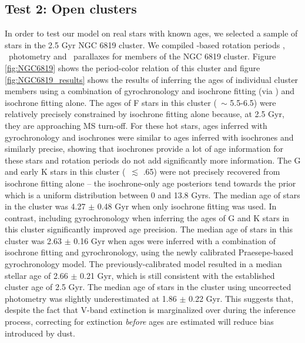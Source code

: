 \subsection{Test 2: Open clusters}
In order to test our model on real stars with known ages, we selected a sample
of stars in the 2.5 Gyr NGC 6819 cluster.
We compiled \kepler-based rotation periods \citep{meibom2015}, \Gaia\
photometry and \gaia\ parallaxes for members of the NGC 6819 cluster.
Figure \ref{fig:NGC6819} shows the period-color relation of this
cluster and figure \ref{fig:NGC6819_results} shows the results of inferring
the ages of individual cluster members using a combination of gyrochronology
and isochrone fitting (via \sd) and isochrone fitting alone.
The ages of F stars in this cluster (\gcolor\ $\sim$ 5.5-6.5) were relatively
precisely constrained by isochrone fitting alone because, at 2.5 Gyr, they are
approaching MS turn-off.
For these hot stars, ages inferred with gyrochronology and isochrones were
similar to ages inferred with isochrones and similarly precise, showing that
isochrones provide a lot of age information for these stars and rotation
periods do not add significantly more information.
The G and early K stars in this cluster (\gcolor\ $\lesssim$ .65) were not
precisely recovered from isochrone fitting alone -- the isochrone-only age
posteriors tend towards the prior which is a uniform distribution between 0
and 13.8 Gyrs.
The median age of stars in the cluster was 4.27 $\pm$ 0.48 Gyr when only
isochrone fitting was used.
In contrast, including gyrochronology when inferring the ages of G and K stars
in this cluster significantly improved age precision.
The median age of stars in this cluster was 2.63 $\pm$ 0.16 Gyr when ages were
inferred with a combination of isochrone fitting and gyrochronology, using the
newly calibrated Praesepe-based gyrochronology model.
The previously-calibrated \citet{angus2015} model resulted in a median stellar
age of 2.66 $\pm$ 0.21 Gyr, which is still consistent with the established
cluster age of 2.5 Gyr.
The median age of stars in the cluster using uncorrected photometry was
slightly underestimated at 1.86 $\pm$ 0.22 Gyr.
This suggests that, despite the fact that V-band extinction is marginalized
over during the inference process, correcting for extinction {\it before} ages
are estimated will reduce bias introduced by dust.


